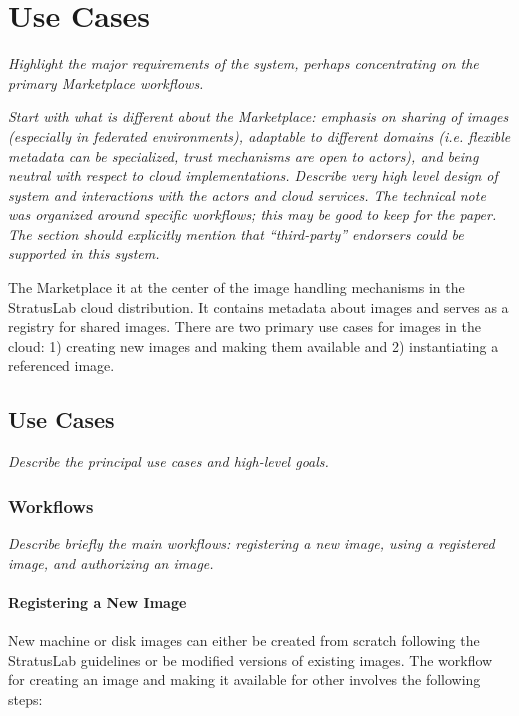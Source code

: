 \section{Use Cases}
\label{sec:usecases}

{\em Highlight the major requirements of the system, perhaps
  concentrating on the primary Marketplace workflows.}

{\em Start with what is different about the Marketplace: emphasis on
  sharing of images (especially in federated environments), adaptable
  to different domains (i.e. flexible metadata can be specialized,
  trust mechanisms are open to actors), and being neutral with respect
  to cloud implementations.  Describe very high level design of system
  and interactions with the actors and cloud services.  The technical
  note was organized around specific workflows; this may be good to
  keep for the paper.  The section should explicitly mention that
  ``third-party'' endorsers could be supported in this system.}

The Marketplace it at the center of the image handling mechanisms in
the StratusLab cloud distribution.  It contains metadata about images
and serves as a registry for shared images.  There are two primary use
cases for images in the cloud: 1) creating new images and making them
available and 2) instantiating a referenced image.

\subsection{Use Cases}

{\em Describe the principal use cases and high-level goals.}

\subsubsection{Workflows}

{\em Describe briefly the main workflows: registering a new image,
  using a registered image, and authorizing an image.}

\paragraph{Registering a New Image}

New machine or disk images can either be created from scratch
following the StratusLab guidelines or be modified versions of
existing images.  The workflow for creating an image and making it
available for other involves the following steps:

